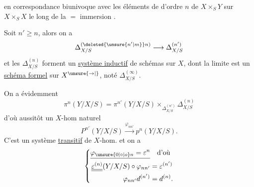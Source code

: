 en correspondance biunivoque avec les éléments de  d'ordre $n$ de $X\times_S Y$  sur $X\times_S X$ le long de la $=$ immersion \unsure{\ldots|{}}. \deleted{\unsure{$\Gamma_\varphi$}}

Soit $n'\geq n$, alors on a
\[
\Delta^{(\deleted{\unsure{n'|m}}n)}_{X/S}\longrightarrow\Delta^{(n')}_{X/S}
\]
et les $\Delta^{(n)}_{X/S}$ forment un \uline{système inductif} de schémas sur $X$, dont la limite est un \uline{schéma formel} sur $X^{\unsure{\to|{}}}$, noté $\Delta^{(\infty)}_{X/S}$.

On a évidemment
\[
\pi^n(Y/X/S)=\pi^{n'}(Y/X/S)\times_{\Delta^{(n')}_{X/S}}\Delta^{(n)}_{X/S}
\]
d'où aussitôt un $X$-hom naturel
\[
P^{n'}(Y/X/S)\xrightarrow{\varphi_{nn'}}p^n(Y/X/S).
\]
C'est un système \uline{transitif} de $X$-hom. et on a \deleted{$\unsure{\varphi}$}
\[
\left\{\begin{aligned}
\underline{\varphi_{\unsure{0|\circ|o}n}=\varepsilon^n}&\quad\text{d'où}\\
\underline{\underline{\varepsilon^{(n)}}}(Y/X/S)\circ\varphi_{nn'}&=\varepsilon^{(n')}\\
\varphi_{nn'}d^{(n')}&=d^{(n)}.
\end{aligned}\right.
\]

